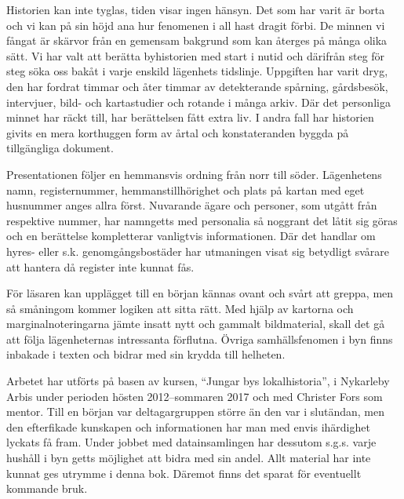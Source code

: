 

Historien kan inte tyglas, tiden visar ingen hänsyn. Det som har varit är borta och vi kan på sin höjd ana hur fenomenen i all hast dragit förbi. De minnen vi fångat är skärvor från en gemensam bakgrund som kan återges på många olika sätt. Vi har valt att berätta byhistorien med start i nutid och därifrån steg för steg söka oss bakåt i varje enskild lägenhets tidslinje. Uppgiften har varit dryg, den har fordrat timmar och åter timmar av detekterande spårning, gårdsbesök, intervjuer, bild- och kartastudier och rotande i många arkiv. Där det personliga minnet har räckt till, har berättelsen fått extra liv. I andra fall har historien givits en mera korthuggen form av årtal och konstateranden byggda på tillgängliga dokument.

Presentationen följer en hemmansvis ordning från norr till söder. Lägenhetens namn, registernummer, hemmanstillhörighet och plats på kartan med eget husnummer anges allra först. Nuvarande ägare och personer, som utgått från respektive nummer, har namngetts med personalia så noggrant det låtit sig göras och en berättelse kompletterar vanligtvis informationen. Där det handlar om hyres- eller s.k. genomgångsbostäder har utmaningen visat sig betydligt svårare att hantera då register inte kunnat fås.

För läsaren kan upplägget till en början kännas ovant och svårt att greppa, men så småningom kommer logiken att sitta rätt. Med hjälp av kartorna och marginalnoteringarna jämte insatt nytt och gammalt bildmaterial, skall det gå att följa lägenheternas intressanta förflutna. Övriga samhällsfenomen i byn finns inbakade i texten och bidrar med sin krydda till helheten.

Arbetet har utförts på basen av kursen, ``Jungar bys lokalhistoria'', i Nykarleby Arbis under perioden hösten 2012--sommaren 2017 och med Christer Fors som mentor. Till en början var deltagargruppen större än den var i slutändan, men den efterfikade kunskapen och informationen har man med envis ihärdighet lyckats få fram. Under jobbet med datainsamlingen har dessutom s.g.s. varje hushåll i byn getts möjlighet att bidra med sin andel. Allt material har inte kunnat ges utrymme i denna bok. Däremot finns det sparat för eventuellt kommande bruk.


